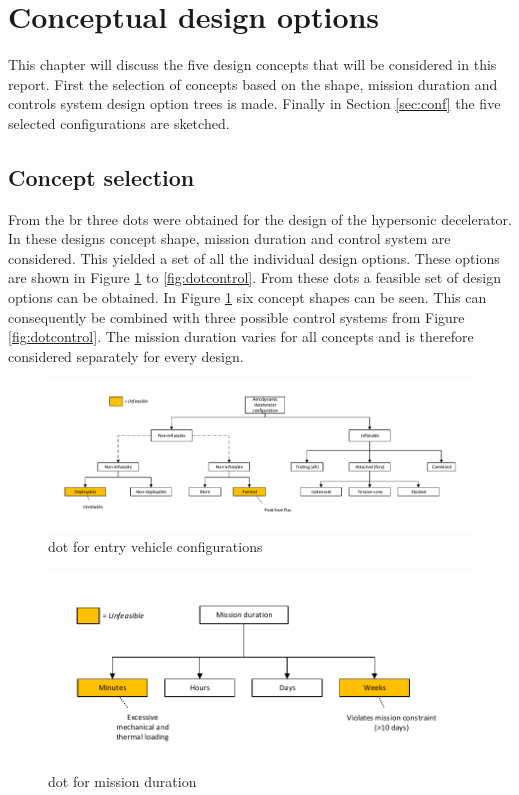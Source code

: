 \section{Conceptual design options} \label{ch:options}
This chapter will discuss the five design concepts that will be considered in this report. First the selection of concepts based on the shape, mission duration and controls system design option trees is made. Finally in Section \ref{sec:conf} the five selected configurations are sketched. 

\subsection{Concept selection}
 From the \acrfull{br} three \glspl{dot} were obtained for the design of the hypersonic decelerator. In these designs concept shape, mission duration and control system are considered. This yielded a set of all the individual design options. These options are shown in Figure \ref{fig:dotshape} to \ref{fig:dotcontrol}. From these \glspl{dot} a feasible set of design options can be obtained. In Figure \ref{fig:dotshape} six concept shapes can be seen. This can consequently be combined with three possible control systems from Figure \ref{fig:dotcontrol}. The mission duration varies for all concepts and is therefore considered separately for every design. 

\begin{figure}[H]
\hspace{-23mm}
\includegraphics[width = 1.25\textwidth]{Figure/DOT_configuration.pdf}
\vspace{-5mm}
\caption{\acrlong{dot} for entry vehicle configurations}
\label{fig:dotshape}
\end{figure}

\begin{figure}[H]
\centering
\includegraphics[width = 1.0\textwidth]{Figure/DOT_missionduration.pdf}
\vspace{-5mm}
\caption{\acrlong{dot} for mission duration}
\label{fig:dotduration}
\end{figure}

